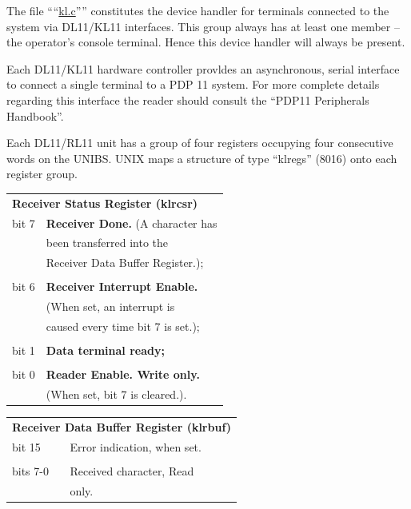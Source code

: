 
The file ````\href{./v6/dmr/kl.c}{kl.c}'''' constitutes the device
handler for terminals connected to the
system via DL11/KL11 interfaces. This
group always has at least one member -- the operator's console terminal. Hence
this device handler will always be
present.

Each DL11/KL11 hardware controller provldes an asynchronous, serial interface
to connect a single terminal to a PDP
11 system. For more complete details
regarding this interface the reader
should consult the ``PDP11 Peripherals
Handbook''.


Each DL11/RL11 unit has a group of four
registers occupying four consecutive
words on the UNIBS. UNIX maps a
structure of type ``klregs'' (8016) onto
each register group.

\noindent\begin{tabular}{ll}\\
\multicolumn{2}{l}{\bf Receiver Status Register (klrcsr)} \\
bit 7 & {\bf Receiver Done.} (A character has\\
      & been transferred into the\\
      & Receiver Data Buffer Register.);\\
\\
bit 6 & {\bf Receiver Interrupt Enable.}\\
      & (When set, an interrupt is\\
      & caused every time bit 7 is set.);\\
\\
bit 1 & {\bf Data terminal ready;}\\
\\
bit 0 & {\bf Reader Enable. Write only.}\\
      & (When set, bit 7 is cleared.).\\
\end{tabular}

\noindent\begin{tabular}{ll}\\
\multicolumn{2}{l}{\bf Receiver Data Buffer Register (klrbuf)} \\
bit 15 & Error indication, when set.\\
\\
bits 7-0 & Received character, Read\\
         & only.\\
\end{tabular}


